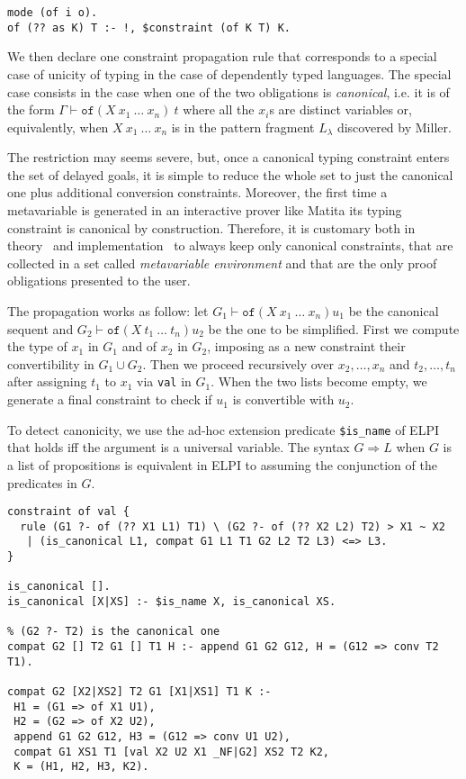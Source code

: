 \documentclass{easychair}
\begin{document}
\begin{Verbatim}
mode (of i o).
of (?? as K) T :- !, $constraint (of K T) K.
\end{Verbatim}

We then declare one constraint propagation rule that corresponds to a special case of unicity of typing in the case of dependently typed languages. The special case consists in the case when one of the two obligations is \emph{canonical}, i.e. it is of the form $\Gamma \vdash \mathtt{of} (X~x_1~\ldots~x_n)~t$ where all the $x_i$s are distinct variables or, equivalently, when $X~x_1~\ldots~x_n$ is in the pattern fragment $L_\lambda$ discovered by Miller.

The restriction may seems severe, but, once a canonical typing constraint enters the set of delayed goals, it is simple to reduce the whole set to just the canonical one plus additional conversion constraints. Moreover, the first time a metavariable is generated in an interactive prover like Matita its typing constraint is canonical by construction. Therefore, it is customary both in theory~\cite{jojgov} and implementation~\cite{bidir} to always keep only canonical constraints, that are collected in a set called \emph{metavariable environment} and that are the only proof obligations presented to the user.

The propagation works as follow: let $G_1 \vdash \mathtt{of} (X~x_1~\ldots~x_n) u_1$ be the canonical sequent and $G_2 \vdash \mathtt{of} (X~t_1~\ldots~t_n) u_2$ be the one to be simplified. First we compute the type of $x_1$ in $G_1$ and of $x_2$ in $G_2$, imposing as a new constraint their convertibility in $G_1 \cup G_2$. Then we proceed recursively over $x_2,\ldots,x_n$ and $t_2,\ldots,t_n$ after assigning $t_1$ to $x_1$ via \verb+val+ in $G_1$. When the two lists become empty, we generate a final constraint to check if $u_1$ is convertible with $u_2$.

To detect canonicity, we use the ad-hoc extension predicate \verb+$is_name+ of ELPI that holds iff the argument is a universal variable. The syntax $G \Rightarrow L$ when $G$ is a list of propositions is equivalent in ELPI to assuming the conjunction of the predicates in $G$.

\begin{Verbatim}
constraint of val {
  rule (G1 ?- of (?? X1 L1) T1) \ (G2 ?- of (?? X2 L2) T2) > X1 ~ X2
   | (is_canonical L1, compat G1 L1 T1 G2 L2 T2 L3) <=> L3.
}

is_canonical [].
is_canonical [X|XS] :- $is_name X, is_canonical XS.

% (G2 ?- T2) is the canonical one
compat G2 [] T2 G1 [] T1 H :- append G1 G2 G12, H = (G12 => conv T2 T1).

compat G2 [X2|XS2] T2 G1 [X1|XS1] T1 K :-
 H1 = (G1 => of X1 U1),
 H2 = (G2 => of X2 U2),
 append G1 G2 G12, H3 = (G12 => conv U1 U2),
 compat G1 XS1 T1 [val X2 U2 X1 _NF|G2] XS2 T2 K2,
 K = (H1, H2, H3, K2).
\end{Verbatim}
\end{document}
